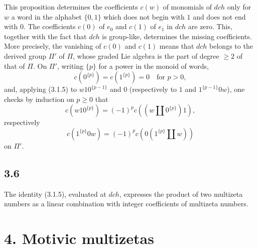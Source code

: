 \documentclass[10pt]{article}
\newcommand{\shuffle}{\mathbin{\amalg}}
\begin{document}
This proposition determines the coefficients $c(w)$ of monomials of $dch$ only for $w$ a word in the alphabet $\{0,1\}$ which does not begin with $1$ and does not end with $0$.
The coefficients $c(0)$ of $e_0$ and $c(1)$ of $e_1$ in $dch$ are zero.
This, together with the fact that $dch$ is group-like, determines the missing coefficients.
More precisely, the vanishing of $c(0)$ and $c(1)$ means that $dch$ belongs to the derived group $\Pi'$ of $\Pi$, whose graded Lie algebra is the part of degree $\geq2$ of that of $\Pi$.
On $\Pi'$, writing $\{p\}$ for a power in the monoid of words,
\begin{equation}
 c(0^{\{p\}})=c(1^{\{p\}})=0\quad\text{for }p>0,
\tag{3.5.1}
\end{equation}
and, applying (3.1.5) to $w10^{\{p-1\}}$ and $0$ (respectively to $1$ and $1^{\{p-1\}}0w$), one checks by induction on $p\geq0$ that
\begin{equation}
 c(w10^{\{p\}})=(-1)^p c((w\shuffle 0^{\{p\}})1),
\tag{3.5.2}
\end{equation}
respectively
\[
 c(1^{\{p\}}0w)=(-1)^p c(0(1^{\{p\}}\shuffle w))
\]
on $\Pi'$.

\subsection*{3.6}
The identity (3.1.5), evaluated at $dch$, expresses the product of two multizeta numbers as a linear combination with integer coefficients of multizeta numbers.

\section*{4. Motivic multizetas}
\end{document}
